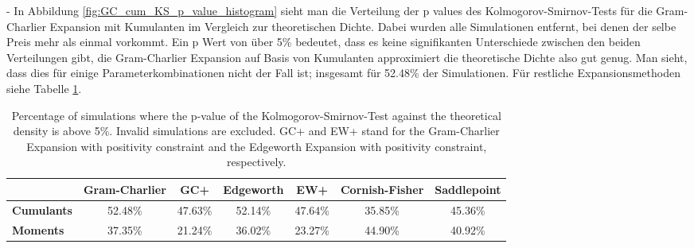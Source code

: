 - In Abbildung \ref{fig:GC_cum_KS_p_value_histogram} sieht man die Verteilung der p values des Kolmogorov-Smirnov-Tests für die Gram-Charlier Expansion mit Kumulanten im Vergleich zur theoretischen Dichte. Dabei wurden alle Simulationen entfernt, bei denen der selbe Preis mehr als einmal vorkommt. Ein p Wert von über 5\% bedeutet, dass es keine signifikanten Unterschiede zwischen den beiden Verteilungen gibt, die Gram-Charlier Expansion auf Basis von Kumulanten approximiert die theoretische Dichte also gut genug. Man sieht, dass dies für einige Parameterkombinationen nicht der Fall ist; insgesamt für 52.48\% der Simulationen. Für restliche Expansionsmethoden siehe Tabelle \ref{tab:KS_p_value_percentage}.

\begin{table}[h]
    \centering
    \begin{tabular}{l|c|c|c|c|c|c}
        & \textbf{Gram-Charlier} & \textbf{GC+} & \textbf{Edgeworth} & \textbf{EW+} & \textbf{Cornish-Fisher} & \textbf{Saddlepoint} \\
        \hline
        \textbf{Cumulants} & 52.48\% & 47.63\% & 52.14\% & 47.64\% & 35.85\% & 45.36\% \\
        \textbf{Moments} & 37.35\% & 21.24\% & 36.02\% & 23.27\% & 44.90\% & 40.92\%
    \end{tabular}
    \caption{Percentage of simulations where the p-value of the Kolmogorov-Smirnov-Test against the theoretical density is above 5\%. Invalid simulations are excluded. GC+ and EW+ stand for the Gram-Charlier Expansion with positivity constraint and the Edgeworth Expansion with positivity constraint, respectively.}
    \label{tab:KS_p_value_percentage}
\end{table}


